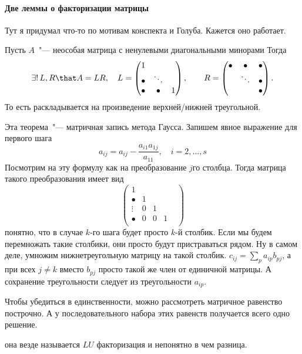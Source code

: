 \documentclass{trlnotes}
\begin{document}
\paragraph{Две леммы о факторизации матрицы}
\label{par:lin::factor}
 \begin{aux}
   Тут я придумал что-то по мотивам конспекта и Голуба. Кажется оно работает.
 \end{aux} 
\begin{lem}\label{lem:lin::factor::lr}
  Пусть $A$~"--- неособая матрица с ненулевыми диагональными минорами
  Тогда
  \[
    \exists!\, L,R \that A = LR, \quad
    L = \begin{pmatrix}
      1 &  & \\
      \bullet  & \ddots  & \\
      \bullet &\bullet &1\\
    \end{pmatrix} , \qquad
    R = \begin{pmatrix}
      \bullet & \bullet & \bullet\\
        & \ddots  & \bullet\\
        &         &\bullet\\
    \end{pmatrix}.
  \]
  То есть раскладывается на произведение верхней/нижней треугольной.
\end{lem}
\begin{prf}
  Эта теорема~"--- матричная запись метода Гаусса. 
  Запишем явное выражение для первого шага
  \[
    a_{ij} = a_{ij} - \frac{a_{i1}a_{1j}}{a_{11}}, \quad i = 2, \dotsc, s
  \]
  Посмотрим на эту формулу как на преобразование $j$го столбца. Тогда матрица 
  такого преобразования имеет вид
  \[
    \begin{pmatrix}
      1 &   & & & \\
      \bullet  & 1 & & \\
      \vdots  & 0 & 1& \\
      \bullet  & 0 & 0& 1\\
    \end{pmatrix}
  \]
  понятно, что в случае $k$-го шага будет просто $k$-й столбик.
  Если мы будем перемножать такие столбики, они просто будут пристраваться рядом.
  Ну в самом деле, умножим нижнетреугольную  матрицу на такой столбик.
  $c_{ij} = \sum_{p}a_{ip}b_{pj}$, а при всех $j \neq k$ вместо $b_{pj}$ просто
  такой же член от единичной матрицы. А сохранение треугольности следует из
  треугольности $a_{ip}$.
  
  Чтобы убедиться в единственности, можно рассмотреть матричное равенство
  построчно. А у последовательного 
  набора этих равенств получается всего одно решение.
\end{prf}
\begin{aux}
  она везде называется $LU$ факторизация и непонятно в чем разница.
\end{aux}
\end{document}
